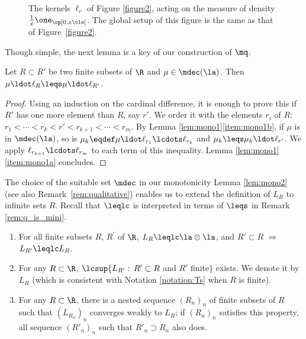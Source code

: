 \begin{figure}[t]
\def\svgwidth{.7\textwidth}
\hspace*{\fill}\hspace*{\fill}\hspace*{\fill}\mbox{}\hspace*{\fill}\hspace*{\fill}
\caption{The kernels $\ell_r$ of Figure \ref{figure2}, acting on the measure of density $\frac1x\one_{\op]0,x\clo[}$. The global setup of this figure is the same as that of Figure~\ref{figure2}.}\label{figure3}
\end{figure}

Though simple, the next lemma is a key of our construction of $\mq$.
\begin{lem}\label{lem:mono2}
Let $R\subset R'$ be two finite subsets of\/ $\R$ and $\mu\in\mdec(\la)$. Then $\mu \ldot\ell_R\leqs \mu \ldot\ell_{R'}$.
\end{lem}
\begin{proof}
Using an induction on the cardinal difference, it is enough to prove this if $R'$ has one more element than $R$, say $r'$. We order it with the elements $r_i$ of $R$: $r_1<\cdots<r_k<r'<r_{k+1}<\cdots<r_m$. By Lemma \ref{lem:mono1}\eqref{item:mono1b}, if $\mu$ is in $\mdec(\la)$, so is $\mu_k\eqdef\mu\ldot\ell_{r_1}\lcdots \ell_{r_k}$ and $\mu_k\leqs \mu_k \ldot\ell_{r'}$. We apply $\ell_{r_{k+1}}\lcdots \ell_{r_m}$ to each term of this inequality. Lemma \ref{lem:mono1}\eqref{item:mono1a} concludes.
\end{proof}

\noindent The choice of the suitable set $\mdec$ in our monotonicity Lemma \ref{lem:mono2} (see also Remark~\ref{rem:qualitative}) enables us to extend the definition of $L_R$ to infinite sets $R$. Recall that $\leqlc$ is interpreted in terms of $\leqs$ in Remark \ref{rem:q_is_mini}.

\skpt
\begin{lemnotation}\label{lem:existenceT}
\begin{enumerate}
\item
\label{p1:lem:existenceT} For all finite subsets $R$, $R^{\prime}$ of\/ $\R$, $L_R\leqlc \la\otimes\la$, and $R'\subset R$ $\Rightarrow$ $L_{R'}\leqlc L_{R}$.

\item
\label{p2:def_L_R} For any $R\subset\R$, $\lcsup\{L_{R'}:\,R'\subset R$ and $R'$ finite$\}$ exists. We denote it by $L_R$ (which is consistent with Notation \ref{notation:Ts} when $R$ is finite). 

\item
\label{p3:def_L_R} For any $R\subset\R$, there is a nested sequence $(R_n)_n$ of finite subsets of $R$ such that $(L_{R_n})_n$ converges weakly to $L_R$; if $(R_n)_n$ satisfies this property, all sequence $(R'_n)_n$ such that $R'_n\supset R_n$ also does.
\end{enumerate}
\end{lemnotation}

